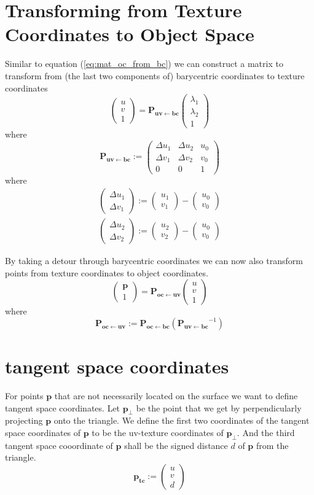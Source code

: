 \documentclass{article}
\newcommand{\point}[1]{\mathbf{#1}}
\newcommand{\mat}[1]{\mathbf{#1}}
\newcommand{\pMat}[2]{\mat{P_{#1 \leftarrow #2}}}
\newcommand{\colvec}[1]{\begin{pmatrix}#1\end{pmatrix}}
\begin{document}
\section{Transforming from Texture Coordinates to Object Space}

Similar to equation (\ref{eq:mat_oc_from_bc}) we can construct a matrix to transform from (the last two components of) barycentric coordinates to texture coordinates
\[
 \colvec{u \\ v \\1} = \pMat{uv}{bc} \colvec{\lambda_1 \\ \lambda_2 \\ 1}
\]
where
\begin{equation}
 \pMat{uv}{bc} := \begin{pmatrix} 
                  \Delta u_1 & \Delta u_2 & u_0 \\
                  \Delta v_1 & \Delta v_2 & v_0 \\
                  0 & 0 & 1
                 \end{pmatrix}
\end{equation}
where
\begin{align*}
 \colvec{\Delta u_1 \\ \Delta v_1} := \colvec{u_1 \\ v_1} - \colvec{u_0 \\ v_0}\\
 \colvec{\Delta u_2 \\ \Delta v_2} := \colvec{u_2 \\ v_2} - \colvec{u_0 \\ v_0}
\end{align*}

By taking a detour through barycentric coordinates we can now also transform points from texture coordinates to object coordinates.
\begin{equation*}
\colvec{\point{p}\\1} = \pMat{oc}{uv} \colvec{u \\ v \\1} 
\end{equation*}
where
\begin{equation*}
 \pMat{oc}{uv} := \pMat{oc}{bc}(\pMat{uv}{bc}^{-1}) 
\end{equation*}

\section{tangent space coordinates}
For points \(\point{p}\) that are not necessarily located on the surface we want to define tangent space coordinates. Let \(\point{p_\perp}\) be the point that we get by perpendicularly projecting \(\point{p}\) onto the triangle. We define the first two coordinates of the tangent space coordinates of \(\point{p}\) to be the uv-texture coordinates of \(\point{p_\perp}\). And the third tangent space cooordinate of \(\point{p}\) shall be the signed distance \(d\) of \(\point{p}\) from the triangle.
\begin{equation*}
 \point{p_{tc}} := \colvec{u \\ v \\ d}
\end{equation*}
\end{document}
